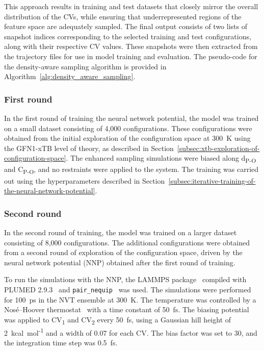 This approach results in training and test datasets that closely mirror the overall distribution of the CVs, while ensuring that underrepresented regions of the feature space are adequately sampled. The final output consists of two lists of snapshot indices corresponding to the selected training and test configurations, along with their respective CV values. These snapshots were then extracted from the trajectory files for use in model training and evaluation. The pseudo-code for the density-aware sampling algorithm is provided in Algorithm~\ref{alg:density_aware_sampling}.



\subsubsection{First round}
In the first round of training the neural network potential, the model was trained on a small dataset consisting of 4,000 configurations. These configurations were obtained from the initial exploration of the configuration space at 300~K using the GFN1-xTB level of theory, as described in Section~\ref{subsec:xtb-exploration-of-configuration-space}. The enhanced sampling simulations were biased along d\textsubscript{P-O} and C\textsubscript{P-O}, and no restraints were applied to the system. The training was carried out using the hyperparameters described in Section~\ref{subsec:iterative-training-of-the-neural-network-potential}.



\subsubsection{Second round}
In the second round of training, the model was trained on a larger dataset consisting of 8,000 configurations. The additional configurations were obtained from a second round of exploration of the configuration space, driven by the neural network potential (NNP) obtained after the first round of training.

To run the simulations with the NNP, the LAMMPS package~\citep{thompsonLAMMPSFlexibleSimulation2022} compiled with PLUMED 2.9.3~\citep{tribelloPLUMED2New2014} and \texttt{pair\_nequip}~\citep{MirgroupPair_nequip} was used. The simulations were performed for 100~ps in the NVT ensemble at 300~K. The temperature was controlled by a Nos\'e--Hoover thermostat~\citep{noseUnifiedFormulationConstant1984, hooverCanonicalDynamicsEquilibrium1985} with a time constant of 50~fs. The biasing potential was applied to CV\textsubscript{1} and CV\textsubscript{2} every 50~fs, using a Gaussian hill height of 2~kcal~mol\textsuperscript{-1} and a width of 0.07 for each CV. The bias factor was set to 30, and the integration time step was 0.5~fs.


